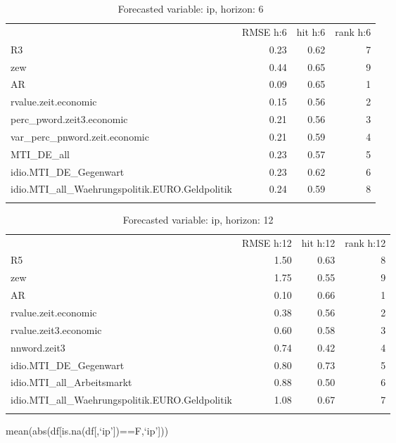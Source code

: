 \documentclass[]{article}
\begin{document}
\begin{longtable}[c]{@{}lrrr@{}}
\toprule\addlinespace
& RMSE h:6 & hit h:6 & rank h:6
\\\addlinespace
\midrule\endhead
R3 & 0.23 & 0.62 & 7
\\\addlinespace
zew & 0.44 & 0.65 & 9
\\\addlinespace
AR & 0.09 & 0.65 & 1
\\\addlinespace
rvalue.zeit.economic & 0.15 & 0.56 & 2
\\\addlinespace
perc\_pword.zeit3.economic & 0.21 & 0.56 & 3
\\\addlinespace
var\_perc\_pnword.zeit.economic & 0.21 & 0.59 & 4
\\\addlinespace
MTI\_DE\_all & 0.23 & 0.57 & 5
\\\addlinespace
idio.MTI\_DE\_Gegenwart & 0.23 & 0.62 & 6
\\\addlinespace
idio.MTI\_all\_Waehrungspolitik.EURO.Geldpolitik & 0.24 & 0.59 & 8
\\\addlinespace
\bottomrule
\addlinespace
\caption{Forecasted variable: ip, horizon: 6}
\end{longtable}

\begin{longtable}[c]{@{}lrrr@{}}
\toprule\addlinespace
& RMSE h:12 & hit h:12 & rank h:12
\\\addlinespace
\midrule\endhead
R5 & 1.50 & 0.63 & 8
\\\addlinespace
zew & 1.75 & 0.55 & 9
\\\addlinespace
AR & 0.10 & 0.66 & 1
\\\addlinespace
rvalue.zeit.economic & 0.38 & 0.56 & 2
\\\addlinespace
rvalue.zeit3.economic & 0.60 & 0.58 & 3
\\\addlinespace
nnword.zeit3 & 0.74 & 0.42 & 4
\\\addlinespace
idio.MTI\_DE\_Gegenwart & 0.80 & 0.73 & 5
\\\addlinespace
idio.MTI\_all\_Arbeitsmarkt & 0.88 & 0.50 & 6
\\\addlinespace
idio.MTI\_all\_Waehrungspolitik.EURO.Geldpolitik & 1.08 & 0.67 & 7
\\\addlinespace
\bottomrule
\addlinespace
\caption{Forecasted variable: ip, horizon: 12}
\end{longtable}

mean(abs(df{[}is.na(df{[},`ip'{]})==F,`ip'{]}))
\end{document}
